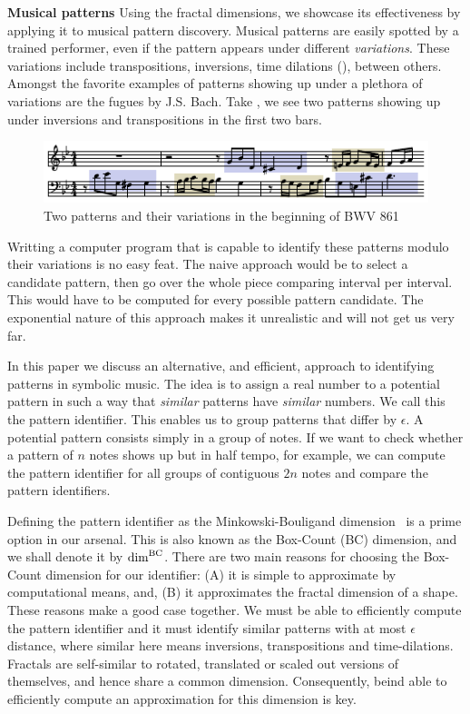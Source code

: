 \textbf{Musical patterns}
Using the fractal dimensions, we showcase its effectiveness by applying it to
musical pattern discovery. 
Musical patterns are easily spotted by a trained performer,
even if the pattern appears under different \emph{variations}.  These
variations include transpositions, inversions, time dilations (), between
others. Amongst the favorite examples of patterns showing up under a
plethora of variations are the fugues by J.S. Bach. Take
, we see two patterns showing up under
inversions and transpositions in the first two bars.

\begin{figure}
  \includegraphics[width=\linewidth]{src/img/bwv861-start-section-patterns.pdf}
  \caption{Two patterns and their variations in the beginning of BWV 861}
  \label{fig:bwv861-start}
\end{figure}

  Writting a computer program that is capable to identify these
patterns modulo their variations is no easy feat. The naive approach
would be to select a candidate pattern, then go over the whole
piece comparing interval per interval. This would have to be computed
for every possible pattern candidate. The exponential nature of this
approach makes it unrealistic and will not get us very far.

  In this paper we discuss an alternative, and efficient, approach to
identifying patterns in symbolic music. The idea is to assign a real
number to a potential pattern in such a way that \emph{similar}
patterns have \emph{similar} numbers. We call this the pattern
identifier.  This enables us to group patterns that differ by
$\epsilon$.  A potential pattern consists simply in a group of
notes. If we want to check whether a pattern of $n$ notes shows up but
in half tempo, for example, we can compute the pattern identifier for
all groups of contiguous $2n$ notes and compare the pattern
identifiers.  

  Defining the pattern identifier as the Minkowski-Bouligand
dimension~\cite{bouligand1928ensembles} is a prime option in our
arsenal.  This is also known as the Box-Count (BC) dimension, and we
shall denote it by $\mathrm{dim}^{\mathrm{BC}}$. There are two main reasons for choosing
the Box-Count dimension for our identifier: (A) it is simple to
approximate by computational means, and, (B) it approximates the
fractal dimension of a shape.  These reasons make a good case
together. We must be able to efficiently compute the pattern
identifier and it must identify similar patterns with at most
$\epsilon$ distance, where similar here means inversions,
transpositions and time-dilations. Fractals are self-similar to
rotated, translated or scaled out versions of themselves, and hence
share a common dimension. Consequently, beind able to efficiently
compute an approximation for this dimension is key.  


